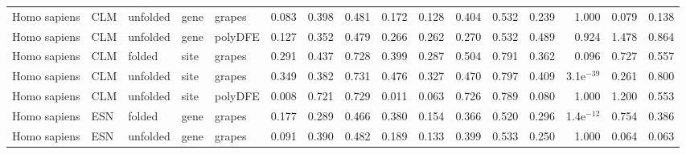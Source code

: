 \begin{longtable}{lllllrrrrrrrrrrr}
        Homo sapiens &                       CLM &  unfolded &  gene &   grapes &                              0.083 &                               0.398 &                 0.481 &                 0.172 &                              0.128 &                               0.404 &                 0.532 &                 0.239 &         1.000 &  0.079 &  0.138 \\
        Homo sapiens &                       CLM &  unfolded &  gene &  polyDFE &                              0.127 &                               0.352 &                 0.479 &                 0.266 &                              0.262 &                               0.270 &                 0.532 &                 0.489 &         0.924 &  1.478 &  0.864 \\
        Homo sapiens &                       CLM &    folded &  site &   grapes &                              0.291 &                               0.437 &                 0.728 &                 0.399 &                              0.287 &                               0.504 &                 0.791 &                 0.362 &         0.096 &  0.727 &  0.557 \\
        Homo sapiens &                       CLM &  unfolded &  site &   grapes &                              0.349 &                               0.382 &                 0.731 &                 0.476 &                              0.327 &                               0.470 &                 0.797 &                 0.409 &  3.1e$^{-39}$ &  0.261 &  0.800 \\
        Homo sapiens &                       CLM &  unfolded &  site &  polyDFE &                              0.008 &                               0.721 &                 0.729 &                 0.011 &                              0.063 &                               0.726 &                 0.789 &                 0.080 &         1.000 &  1.200 &  0.553 \\
        Homo sapiens &                       ESN &    folded &  gene &   grapes &                              0.177 &                               0.289 &                 0.466 &                 0.380 &                              0.154 &                               0.366 &                 0.520 &                 0.296 &  1.4e$^{-12}$ &  0.754 &  0.386 \\
        Homo sapiens &                       ESN &  unfolded &  gene &   grapes &                              0.091 &                               0.390 &                 0.482 &                 0.189 &                              0.133 &                               0.399 &                 0.533 &                 0.250 &         1.000 &  0.064 &  0.063 \\

\end{longtable}

